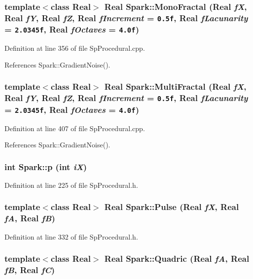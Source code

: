 \subsubsection{\setlength{\rightskip}{0pt plus 5cm}template$<$class Real$>$ Real Spark::Mono\-Fractal (Real {\em f\-X}, Real {\em f\-Y}, Real {\em f\-Z}, Real {\em f\-Increment} = {\tt 0.5f}, Real {\em f\-Lacunarity} = {\tt 2.0345f}, Real {\em f\-Octaves} = {\tt 4.0f})}\label{namespaceSpark_a78}


Definition at line 356 of file Sp\-Procedural.cpp.

References Spark::Gradient\-Noise().
\subsubsection{\setlength{\rightskip}{0pt plus 5cm}template$<$class Real$>$ Real Spark::Multi\-Fractal (Real {\em f\-X}, Real {\em f\-Y}, Real {\em f\-Z}, Real {\em f\-Increment} = {\tt 0.5f}, Real {\em f\-Lacunarity} = {\tt 2.0345f}, Real {\em f\-Octaves} = {\tt 4.0f})}\label{namespaceSpark_a79}


Definition at line 407 of file Sp\-Procedural.cpp.

References Spark::Gradient\-Noise().
\subsubsection{\setlength{\rightskip}{0pt plus 5cm}int Spark::p (int {\em i\-X})\hspace{0.3cm}{\tt  [inline]}}\label{namespaceSpark_a91}


Definition at line 225 of file Sp\-Procedural.h.
\subsubsection{\setlength{\rightskip}{0pt plus 5cm}template$<$class Real$>$ Real Spark::Pulse (Real {\em f\-X}, Real {\em f\-A}, Real {\em f\-B})}\label{namespaceSpark_a103}


Definition at line 332 of file Sp\-Procedural.h.
\subsubsection{\setlength{\rightskip}{0pt plus 5cm}template$<$class Real$>$ Real Spark::Quadric (Real {\em f\-A}, Real {\em f\-B}, Real {\em f\-C})}\label{namespaceSpark_a71}


